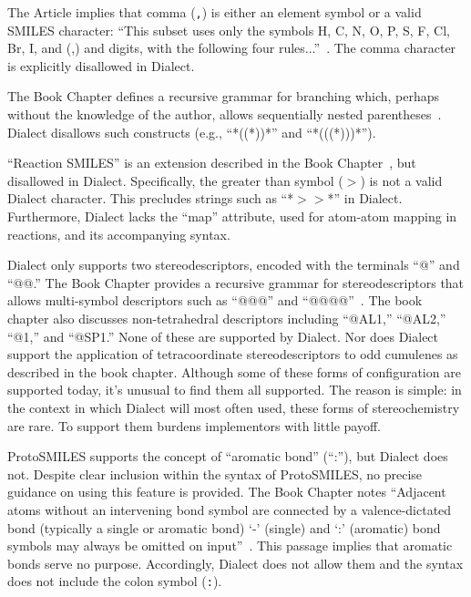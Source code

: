 \documentclass{article}
\def\ttt{\texttt}
\begin{document}
The Article implies that comma (\ttt{,}) is either an element symbol or a valid SMILES character: \enquote{This subset uses only the symbols H, C, N, O, P, S, F, Cl, Br, I, and (,) and digits, with the following four rules...}~\cite[p.~33]{weininger:1988}. The comma character is explicitly disallowed in Dialect.

The Book Chapter defines a recursive grammar for branching which, perhaps without the knowledge of the author, allows sequentially nested parentheses~\cite[p.~86]{weininger:2003}. Dialect disallows such constructs (e.g., \enquote{*((*))*} and \enquote{*(((*)))*}).

\enquote{Reaction SMILES} is an extension described in the Book Chapter~\cite[p.~89]{weininger:2003}, but disallowed in Dialect. Specifically, the greater than symbol (\ttt{$>$}) is not a valid Dialect character. This precludes strings such as \enquote{*$>$$>$*} in Dialect. Furthermore, Dialect lacks the \enquote{map} attribute, used for atom-atom mapping in reactions, and its accompanying syntax.

Dialect only supports two stereodescriptors, encoded with the terminals \enquote{@} and \enquote{@@.} The Book Chapter provides a recursive grammar for stereodescriptors that allows multi-symbol descriptors such as \enquote{@@@} and \enquote{@@@@}~\cite[p.~94]{weininger:2003}. The book chapter also discusses non-tetrahedral descriptors including \enquote{@AL1,} \enquote{@AL2,} \enquote{@1,} and \enquote{@SP1.} None of these are supported by Dialect. Nor does Dialect support the application of tetracoordinate stereodescriptors to odd cumulenes as described in the book chapter. Although some of these forms of configuration are supported today, it's unusual to find them all supported. The reason is simple: in the context in which Dialect will most often used, these forms of stereochemistry are rare. To support them burdens implementors with little payoff.

ProtoSMILES supports the concept of \enquote{aromatic bond} (\enquote{:}), but Dialect does not. Despite clear inclusion within the syntax of ProtoSMILES, no precise guidance on using this feature is provided. The Book Chapter notes \enquote{Adjacent atoms without an intervening bond symbol are connected by a valence-dictated bond (typically a single or aromatic bond) \enquote{-} (single) and \enquote{:} (aromatic) bond symbols may always be omitted on input}~\cite[p.~85]{weininger:2003}. This passage implies that aromatic bonds serve no purpose. Accordingly, Dialect does not allow them and the syntax does not include the colon symbol (\ttt{:}).
\end{document}
